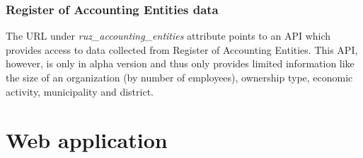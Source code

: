 \documentclass[thesis=B,english]{FITthesis}[2012/06/26]
\begin{document}
\subsubsection{Register of Accounting Entities data}
	The URL under \emph{ruz\_accounting\_entities} attribute points to an API which provides access to data collected from Register of Accounting Entities. This API, however, is only in alpha version and thus only provides limited information like the size of an organization (by number of employees), ownership type, economic activity, municipality and district.

	\section{Web application}
\end{document}
